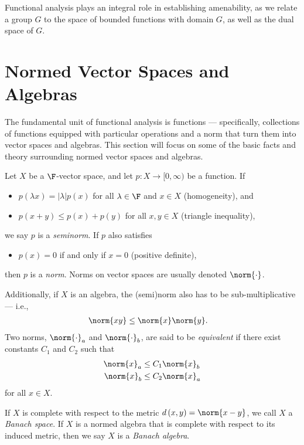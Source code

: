 Functional analysis plays an integral role in establishing amenability, as we relate a group $G$ to the space of bounded functions with domain $G$, as well as the dual space of $G$.
\section{Normed Vector Spaces and Algebras}%
The fundamental unit of functional analysis is functions --- specifically, collections of functions equipped with particular operations and a norm that turn them into vector spaces and algebras. This section will focus on some of the basic facts and theory surrounding normed vector spaces and algebras.
\begin{definition}\label{def:norms}
  Let $X$ be a $\F$-vector space, and let $p\colon X\rightarrow [0,\infty)$ be a function. If
  \begin{itemize}
    \item $p\left(\lambda x\right) = \left\vert \lambda \right\vert p(x)$ for all $\lambda\in \F$ and $x\in X$ (homogeneity), and
    \item $p\left(x + y\right)\leq p\left(x\right) + p\left(y\right)$ for all $x,y\in X$ (triangle inequality),
  \end{itemize}
  we say $p$ is a \textit{seminorm}. If $p$ also satisfies
  \begin{itemize}
    \item $p\left(x\right) = 0 $ if and only if $x = 0$ (positive definite),
  \end{itemize}
  then $p$ is a \textit{norm}. Norms on vector spaces are usually denoted $\norm{\cdot}$.\newline

  Additionally, if $X$ is an algebra, the (semi)norm also has to be sub-multiplicative --- i.e.,
  \begin{align*}
    \norm{xy} &\leq \norm{x}\norm{y}.
  \end{align*}
  Two norms, $\norm{\cdot}_a$ and $\norm{\cdot}_b$, are said to be \textit{equivalent} if there exist constants $C_1$ and $C_2$ such that
  \begin{align*}
    \norm{x}_a &\leq C_1\norm{x}_b\\
    \norm{x}_b &\leq C_2 \norm{x}_a
  \end{align*}
  for all $x\in X$.\newline

  If $X$ is complete with respect to the metric $d\left(x,y\right) = \norm{x-y}$, we call $X$ a \textit{Banach space}. If $X$ is a normed algebra that is complete with respect to its induced metric, then we say $X$ is a \textit{Banach algebra}.
\end{definition}

